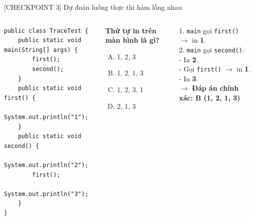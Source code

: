 \documentclass[aspectratio=169, 10pt]{beamer}
\begin{document}
\begin{frame}[fragile]{[CHECKPOINT 3] Dự đoán luồng thực thi hàm lồng nhau}
  \begin{columns}
    \begin{lstlisting}
public class TraceTest {
    public static void main(String[] args) {
        first();
        second();
    }
    public static void first() {
        System.out.println("1");
    }
    public static void second() {
        System.out.println("2");
        first();
        System.out.println("3");
    }
}
    \end{lstlisting}

    \begin{exampleblock}{\textbf{Thứ tự in trên màn hình là gì?}}
      \begin{enumerate}[A.]
        \item 1, 2, 3
        \item 1, 2, 1, 3
        \item 1, 2, 3, 1
        \item 2, 1, 3
      \end{enumerate}
    \end{exampleblock}

    \begin{tcolorbox}[colback=white,colframe=UniBlue,title=\textbf{Giải thích:}]
      \footnotesize
      1. \texttt{main} gọi \texttt{first()} $\to$ in \textbf{1}.\\
      2. \texttt{main} gọi \texttt{second()}:\\
      \quad - In \textbf{2}.\\
      \quad - Gọi \texttt{first()} $\to$ in \textbf{1}.\\
      \quad - In \textbf{3}.\\
      $\to$ \textbf{Đáp án chính xác: B (1, 2, 1, 3)}
    \end{tcolorbox}
  \end{columns}
\end{frame}
\end{document}
